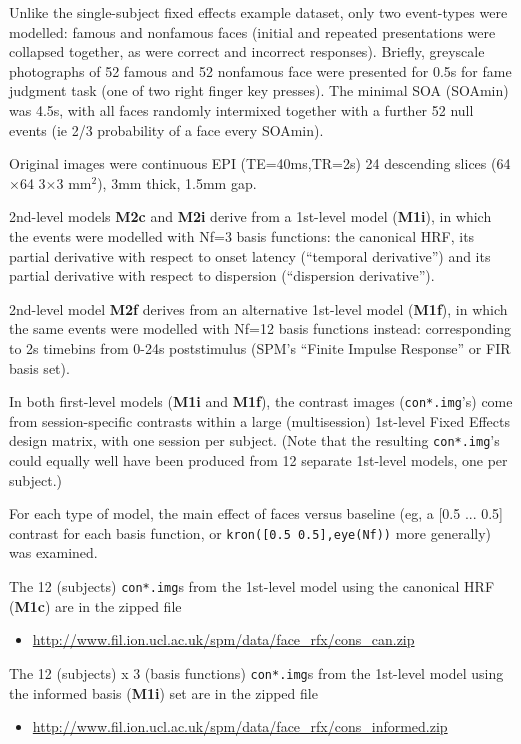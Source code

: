 Unlike the single-subject fixed effects example dataset, only two event-types were modelled: famous and nonfamous faces (initial and repeated presentations were collapsed together, as were correct and incorrect responses). Briefly, greyscale photographs of 52 famous and 52 nonfamous face were presented for 0.5s for fame judgment task (one of two right finger key presses). The minimal SOA (SOAmin) was 4.5s, with all faces randomly intermixed together with a further 52 null events (ie 2/3 probability of a face every SOAmin).

Original images were continuous EPI (TE=40ms,TR=2s) 24 descending slices (64$\times$64 3$\times$3 mm$^2$), 3mm thick, 1.5mm gap.

2nd-level models \textbf{M2c} and \textbf{M2i} derive from a 1st-level model (\textbf{M1i}), in which the events were modelled with Nf=3 basis functions: the canonical HRF, its partial derivative with respect to onset latency (``temporal derivative'') and its partial derivative with respect to dispersion (``dispersion derivative'').

2nd-level model \textbf{M2f} derives from an alternative 1st-level model (\textbf{M1f}), in which the same events were modelled with Nf=12 basis functions instead: corresponding to 2s timebins from 0-24s poststimulus (SPM's ``Finite Impulse Response'' or FIR basis set).

In both first-level models (\textbf{M1i} and \textbf{M1f}), the contrast images (\texttt{con*.img}'s) come from session-specific contrasts within a large (multisession) 1st-level Fixed Effects design matrix, with one session per subject. (Note that the resulting \texttt{con*.img}'s could equally well have been produced from 12 separate 1st-level models, one per subject.)

For each type of model, the main effect of faces versus baseline (eg, a [0.5 ... 0.5] contrast for each basis function, or \texttt{kron([0.5 0.5],eye(Nf))} more generally) was examined.

The 12 (subjects) \texttt{con*.img}s from the 1st-level model using the canonical HRF (\textbf{M1c}) are in the zipped file
\begin{itemize}
\item \url{http://www.fil.ion.ucl.ac.uk/spm/data/face_rfx/cons_can.zip}
\end{itemize}

The 12 (subjects) x 3 (basis functions) \texttt{con*.img}s from the 1st-level model using the informed basis (\textbf{M1i}) set are in the zipped file
\begin{itemize}
\item \url{http://www.fil.ion.ucl.ac.uk/spm/data/face_rfx/cons_informed.zip}
\end{itemize}

